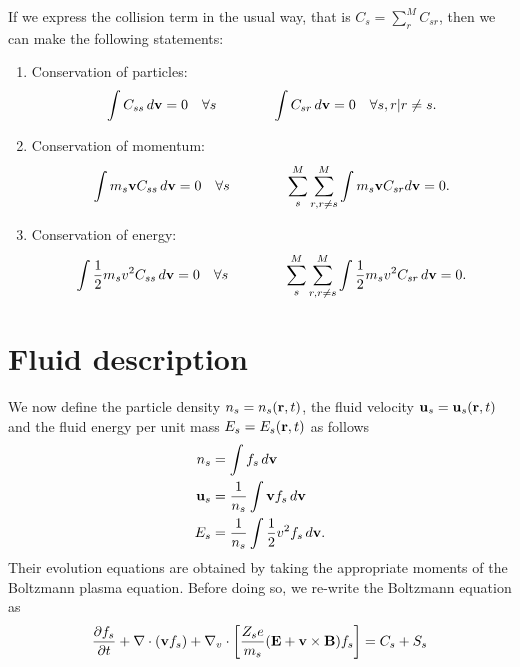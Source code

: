 \documentclass[a4paper,11pt]{report}
\begin{document}
If we express the collision term in the usual way, that is $C_s = \sum_r^M C_{s r}$, then we can make the following statements:
\begin{enumerate}
\item Conservation of particles:
\begin{equation}
    \label{eq:coll_cons_particles}
    \int C_{ss} \, d\mathbf{v} = 0 \quad \forall s \qquad \qquad
    \int C_{sr} \,d\mathbf{v} = 0 \quad \forall s, r | r \ne s.
\end{equation}

\item Conservation of momentum:
\begin{equation}
    \label{eq:coll_cons_momentum}
    \int m_s \mathbf{v} C_{ss} \, d\mathbf{v} = 0 \quad \forall s \qquad \qquad \sum_s^M \sum_{r, r \ne s}^M \int m_s \mathbf{v} C_{sr} d\mathbf{v} = 0.
\end{equation}

\item Conservation of energy:
\begin{equation}
    \label{eq:coll_cons_energy}
    \int \frac{1}{2} m_s v^2 C_{ss} \, d\mathbf{v} = 0 \quad \forall s \qquad \qquad \sum_s^M \sum_{r, r \ne s}^M \int \frac{1}{2} m_s v^2 C_{sr} \, d\mathbf{v} = 0.
\end{equation}

\end{enumerate}

\section{Fluid description}
We now define the particle density $n_s = n_s(\mathbf{r},t)$, the fluid velocity $\mathbf{u}_s = \mathbf{u}_s(\mathbf{r},t)$ and the fluid energy per unit mass $E_s = E_s(\mathbf{r},t)$ as follows
\begin{align}
n_s &= \int f_s \, d\mathbf{v} \\
\mathbf{u}_s &= \frac{1}{n_s} \int \mathbf{v} f_s \, d\mathbf{v} \\
E_s &= \frac{1}{n_s} \int \frac{1}{2} v^2 f_s \, d\mathbf{v}.
\end{align}
Their evolution equations are obtained by taking the appropriate moments of the Boltzmann plasma equation. Before doing so, we re-write the Boltzmann equation as
\begin{equation}
\label{eq:boltz_mod}
\frac{\partial f_s}{\partial t} + \nabla \cdot (\mathbf{v} f_s) + \nabla_v \cdot \left [ \frac{Z_s e}{m_s} ( \mathbf{E} + \mathbf{v} \times \mathbf{B} ) f_s \right ] = C_s + S_s
\end{equation}
\end{document}
